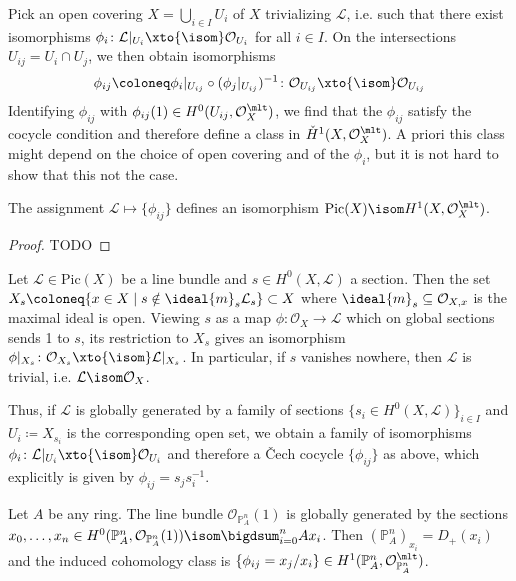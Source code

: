 \documentclass[wip, algebra]{bsteffan-lecturenotes}
\newcommand{\cO}{\mathcal{O}}
\newcommand{\cL}{\mathcal{L}}
\renewcommand{\P}{\mathbb{P}}
\newcommand{\Pic}{\mathrm{Pic}}
\begin{document}
Pick an open covering $X = \bigcup_{i \in I} U_i$ of $X$ trivializing $\cL$, i.e. such that there exist isomorphisms $\phi_i\colon \cL|_{U_i} \xto{\isom} \cO_{U_i}$ for all $i \in I$.
On the intersections $U_{ij} = U_i \cap U_j$, we then obtain isomorphisms 
\begin{equation*}
	\phi_{ij} \coloneq \phi_i|_{U_{ij}} \circ (\phi_j|_{U_{ij}})^{-1}\colon \cO_{U_{ij}} \xto{\isom} \cO_{U_{ij}}
\end{equation*}
Identifying $\phi_{ij}$ with $\phi_{ij}(1) \in H^0(U_{ij}, \cO^\mlt_X)$, we find that the $\phi_{ij}$ satisfy the cocycle condition and therefore define a class in $\check{H}^1(X, \cO^\mlt_X)$.
A priori this class might depend on the choice of open covering and of the $\phi_i$, but it is not hard to show that this not the case.
\begin{proposition}
	The assignment $\cL \mapsto \{\phi_{ij}\}$ defines an isomorphism $\Pic(X) \isom H^1(X, \cO_X^\mlt)$.
\end{proposition}
\begin{proof}
	TODO
\end{proof}
\begin{remark}
	Let $\cL \in \Pic(X)$ be a line bundle and $s \in H^0(X, \cL)$ a section.
	Then the set $X_s \coloneq \{x \in X \mid s \notin \ideal{m}_s \cL_s\} \subset X$ where $\ideal{m}_s \subseteq \cO_{X, x}$ is the maximal ideal is open.
	Viewing $s$ as a map $\phi\colon \cO_X \to \cL$ which on global sections sends 1 to $s$, its restriction to $X_s$ gives an isomorphism $\phi|_{X_s}\colon \cO_{X_s} \xto{\isom} \cL|_{X_s}$.
	In particular, if $s$ vanishes nowhere, then $\cL$ is trivial, i.e. $\cL \isom \cO_X$.

	Thus, if $\cL$ is globally generated by a family of sections $\{s_i \in H^0(X, \cL)\}_{i \in I}$ and $U_i \coloneq X_{s_i}$ is the corresponding open set, we obtain a family of isomorphisms $\phi_i\colon \cL|_{U_i} \xto{\isom} \cO_{U_i}$ and therefore a Čech cocycle $\{\phi_{ij}\}$ as above, which explicitly is given by $\phi_{ij} = s_j s_i^{-1}$.
\end{remark}
\begin{example}
	Let $A$ be any ring.
	The line bundle $\cO_{\P^n_A}(1)$ is globally generated by the sections $x_0, \ldots, x_n \in H^0(\P^n_A, \cO_{\P^n_A}(1)) \isom \bigdsum_{i = 0}^n A x_i$.
	Then $(\P^n_A)_{x_i} = D_+(x_i)$ and the induced cohomology class is $\{\phi_{ij} = x_j / x_i\} \in H^1(\P^n_A, \cO_{\P^n_A}^\mlt)$.
\end{example}
\end{document}
